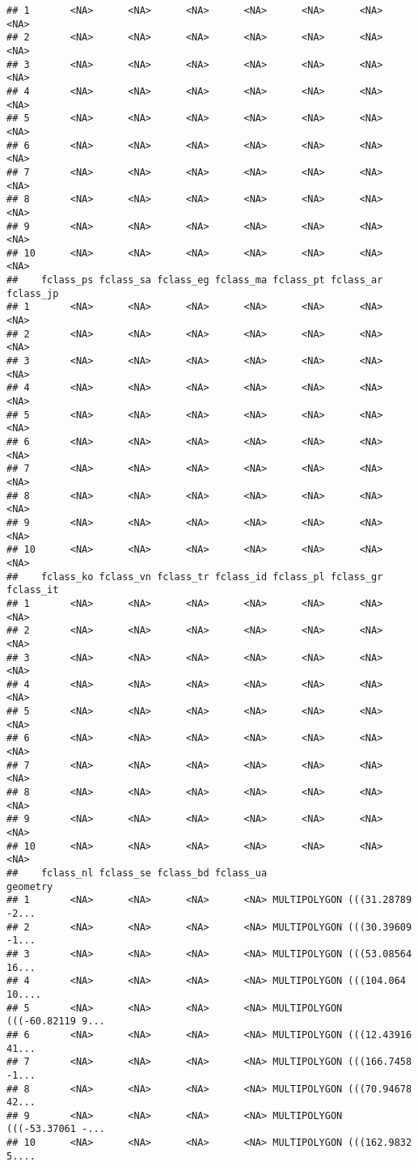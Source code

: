 \documentclass[
]{article}
\begin{document}
\begin{verbatim}
## 1       <NA>      <NA>      <NA>      <NA>      <NA>      <NA>      <NA>
## 2       <NA>      <NA>      <NA>      <NA>      <NA>      <NA>      <NA>
## 3       <NA>      <NA>      <NA>      <NA>      <NA>      <NA>      <NA>
## 4       <NA>      <NA>      <NA>      <NA>      <NA>      <NA>      <NA>
## 5       <NA>      <NA>      <NA>      <NA>      <NA>      <NA>      <NA>
## 6       <NA>      <NA>      <NA>      <NA>      <NA>      <NA>      <NA>
## 7       <NA>      <NA>      <NA>      <NA>      <NA>      <NA>      <NA>
## 8       <NA>      <NA>      <NA>      <NA>      <NA>      <NA>      <NA>
## 9       <NA>      <NA>      <NA>      <NA>      <NA>      <NA>      <NA>
## 10      <NA>      <NA>      <NA>      <NA>      <NA>      <NA>      <NA>
##    fclass_ps fclass_sa fclass_eg fclass_ma fclass_pt fclass_ar fclass_jp
## 1       <NA>      <NA>      <NA>      <NA>      <NA>      <NA>      <NA>
## 2       <NA>      <NA>      <NA>      <NA>      <NA>      <NA>      <NA>
## 3       <NA>      <NA>      <NA>      <NA>      <NA>      <NA>      <NA>
## 4       <NA>      <NA>      <NA>      <NA>      <NA>      <NA>      <NA>
## 5       <NA>      <NA>      <NA>      <NA>      <NA>      <NA>      <NA>
## 6       <NA>      <NA>      <NA>      <NA>      <NA>      <NA>      <NA>
## 7       <NA>      <NA>      <NA>      <NA>      <NA>      <NA>      <NA>
## 8       <NA>      <NA>      <NA>      <NA>      <NA>      <NA>      <NA>
## 9       <NA>      <NA>      <NA>      <NA>      <NA>      <NA>      <NA>
## 10      <NA>      <NA>      <NA>      <NA>      <NA>      <NA>      <NA>
##    fclass_ko fclass_vn fclass_tr fclass_id fclass_pl fclass_gr fclass_it
## 1       <NA>      <NA>      <NA>      <NA>      <NA>      <NA>      <NA>
## 2       <NA>      <NA>      <NA>      <NA>      <NA>      <NA>      <NA>
## 3       <NA>      <NA>      <NA>      <NA>      <NA>      <NA>      <NA>
## 4       <NA>      <NA>      <NA>      <NA>      <NA>      <NA>      <NA>
## 5       <NA>      <NA>      <NA>      <NA>      <NA>      <NA>      <NA>
## 6       <NA>      <NA>      <NA>      <NA>      <NA>      <NA>      <NA>
## 7       <NA>      <NA>      <NA>      <NA>      <NA>      <NA>      <NA>
## 8       <NA>      <NA>      <NA>      <NA>      <NA>      <NA>      <NA>
## 9       <NA>      <NA>      <NA>      <NA>      <NA>      <NA>      <NA>
## 10      <NA>      <NA>      <NA>      <NA>      <NA>      <NA>      <NA>
##    fclass_nl fclass_se fclass_bd fclass_ua                       geometry
## 1       <NA>      <NA>      <NA>      <NA> MULTIPOLYGON (((31.28789 -2...
## 2       <NA>      <NA>      <NA>      <NA> MULTIPOLYGON (((30.39609 -1...
## 3       <NA>      <NA>      <NA>      <NA> MULTIPOLYGON (((53.08564 16...
## 4       <NA>      <NA>      <NA>      <NA> MULTIPOLYGON (((104.064 10....
## 5       <NA>      <NA>      <NA>      <NA> MULTIPOLYGON (((-60.82119 9...
## 6       <NA>      <NA>      <NA>      <NA> MULTIPOLYGON (((12.43916 41...
## 7       <NA>      <NA>      <NA>      <NA> MULTIPOLYGON (((166.7458 -1...
## 8       <NA>      <NA>      <NA>      <NA> MULTIPOLYGON (((70.94678 42...
## 9       <NA>      <NA>      <NA>      <NA> MULTIPOLYGON (((-53.37061 -...
## 10      <NA>      <NA>      <NA>      <NA> MULTIPOLYGON (((162.9832 5....
\end{verbatim}
\end{document}

